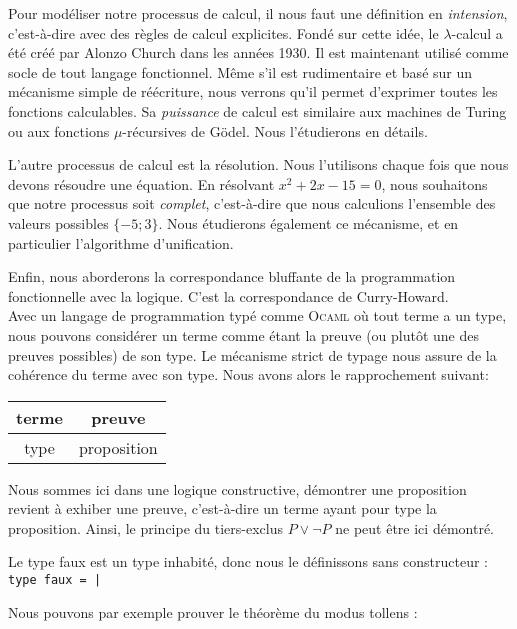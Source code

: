 \documentclass[11pt]{book}
\begin{document}
Pour modéliser notre processus de calcul, il nous faut une définition en \textit{intension}, 
c'est-à-dire avec des règles de calcul explicites. Fondé sur
cette idée, le $\lambda$-calcul a été créé par Alonzo Church dans les années 1930.
Il est maintenant utilisé comme socle de tout langage fonctionnel. 
Même s'il est  rudimentaire et basé sur un mécanisme simple de réécriture,
nous verrons qu'il permet d'exprimer toutes les fonctions calculables. Sa \textit{puissance}
de calcul est similaire aux machines de Turing ou aux fonctions $\mu$-récursives de Gödel.
Nous l'étudierons en détails.

\vspace{0.3cm}
L'autre processus de calcul est la résolution. Nous l'utilisons chaque fois que nous devons résoudre
une équation. En résolvant $x^2+2x-15=0$, nous souhaitons que notre processus 
soit \textit{complet}, c'est-à-dire que nous calculions 
l'ensemble des valeurs possibles $\{-5; 3\}$.
 Nous étudierons également  ce mécanisme, et en particulier l'algorithme d'unification.

\vspace{0.3cm}
Enfin, nous aborderons la correspondance bluffante de la programmation fonctionnelle avec la logique. 
C'est la correspondance de Curry-Howard. \\
Avec un langage de programmation typé comme \textsc{Ocaml} où tout terme a un type, nous pouvons
considérer un terme comme étant  la preuve (ou plutôt une des preuves possibles) de son type. 
Le mécanisme strict de typage nous assure de la cohérence du terme avec son type.
Nous avons alors le rapprochement suivant:

\begin{center}
\begin{tabular}[]{|c|c|}
  \hline
  terme & preuve \\
  \hline
  type & proposition \\
  \hline
\end{tabular}

\end{center}
Nous sommes ici dans une logique constructive, démontrer une proposition revient à exhiber une preuve, c'est-à-dire 
un terme ayant pour type la proposition.
Ainsi, le principe du tiers-exclus $P \vee  \neg P$ ne peut être ici démontré.

Le type faux est un type inhabité, donc nous le définissons sans constructeur : \verb+ type faux = | +

Nous pouvons par exemple prouver le théorème du modus tollens : \\
\end{document}
